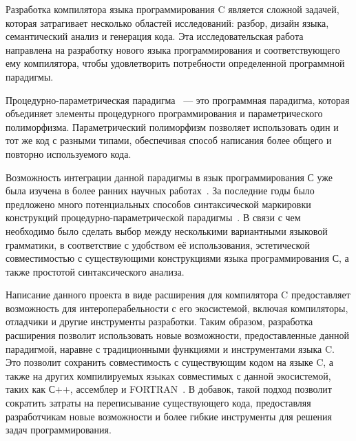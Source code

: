 Разработка компилятора языка программирования C является сложной задачей, которая затрагивает несколько областей исследований: разбор, дизайн языка, семантический анализ и генерация кода. Эта исследовательская работа направлена на разработку нового языка программирования и соответствующего ему компилятора, чтобы удовлетворить потребности определенной программной парадигмы.

Процедурно-параметрическая парадигма~\cite{легалов2000процедурно} --- это программная парадигма, которая объединяет элементы процедурного программирования и параметрического полиморфизма. Параметрический полиморфизм позволяет использовать один и тот же код с разными типами, обеспечивая способ написания более общего и повторно используемого кода.

Возможность интеграции данной парадигмы в язык программирования С уже была изучена в более ранних научных работах~\cite{легалов2016эволюционное}.
За последние годы было предложено много потенциальных способов синтаксической маркировки конструкций процедурно-параметрической парадигмы~\cite{легалов2007применение}.
В связи с чем необходимо было сделать выбор между несколькими вариантными языковой грамматики, в соответствие с удобством её использования, эстетической совместимостью с существующими конструкциями языка программирования С, а также простотой синтаксического анализа.

Написание данного проекта в виде расширения для компилятора C предоставляет возможность для интероперабельности с его экосистемой, включая компиляторы, отладчики и другие инструменты разработки.
Таким образом, разработка расширения позволит использовать новые возможности, предоставленные данной парадигмой, наравне с традиционными функциями и инструментами языка C.
Это позволит сохранить совместимость с существующим кодом на языке C, а также на других компилируемых языках совместимых с данной экосистемой, таких как С++, ассемблер и FORTRAN~\cite{donev2006interoperability}.
В добавок, такой подход позволит сократить затраты на переписывание существующего кода, предоставляя разработчикам новые возможности и более гибкие инструменты для решения задач программирования.



